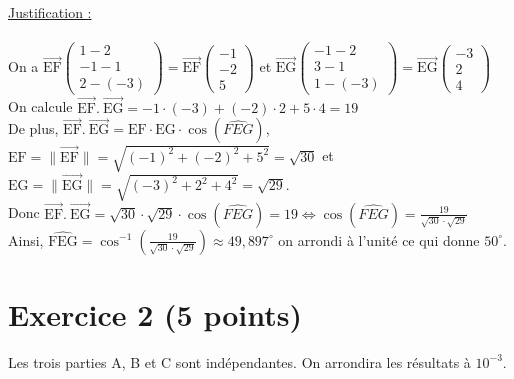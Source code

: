 \documentclass[a4paper, 12pt]{article}
\begin{document}
\noindent
\underline{Justification :}
\\ \\
On a $\overrightarrow{\text{EF}}\begin{pmatrix} 1-2 \\ -1-1 \\2-(-3)\end{pmatrix} = \overrightarrow{\text{EF}}\begin{pmatrix} -1 \\ -2 \\ 5 \end{pmatrix}$ 
et $\overrightarrow{\text{EG}}\begin{pmatrix} -1-2 \\ 3-1\\1-(-3)\end{pmatrix} = \overrightarrow{\text{EG}}\begin{pmatrix} -3 \\ 2 \\ 4 \end{pmatrix}$
\\
On calcule $\overrightarrow{\text{EF}} .\ \overrightarrow{\text{EG}} = -1 \cdot (-3) + (-2) \cdot 2 + 5 \cdot 4 = 19$
\\
De plus, $\overrightarrow{\text{EF}} .\ \overrightarrow{\text{EG}} = \text{EF} \cdot \text{EG} \cdot \cos{\left( \widehat{FEG} \right)}$, 
$\text{EF} = \|\overrightarrow{\text{EF}}\| = \sqrt{(-1)^2 + (-2)^2 + 5^2} = \sqrt{30}$ et 
$\text{EG} = \| \overrightarrow{\text{EG}} \| = \sqrt{(-3)^2 + 2^2 + 4^2} = \sqrt{29}$.
\\
Donc $\overrightarrow{\text{EF}} .\ \overrightarrow{\text{EG}} = \sqrt{30} \cdot \sqrt{29} \cdot \cos{\left( \widehat{FEG} \right)} = 19 \Leftrightarrow \cos{\left( \widehat{FEG} \right)} = \frac{19}{\sqrt{30} \cdot \sqrt{29}}$
\\
Ainsi, $\widehat{\text{FEG}} = \cos^{-1}{ \left( \frac{19}{ \sqrt{30} \cdot \sqrt{29}} \right) } \approx 49,897^{\circ}$ on arrondi à l'unité ce qui donne $50^{\circ}$.

{}
\section*{Exercice 2 (5 points)}

Les trois parties A, B et C sont indépendantes. On arrondira les résultats à $10^{-3}$.

{}
\end{document}

